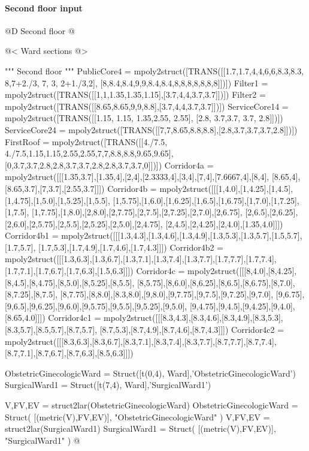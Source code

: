 \documentclass[11pt,oneside]{article}    %
\begin{document}
\paragraph{Second floor input} 
@D Second floor
@{
@< Ward sections @>

""" Second floor """
PublicCore4 = mpoly2struct([TRANS([[1.7,1.7,4,4,6,6,8.3,8.3, 8,7+2./3, 7, 3, 2+1./3,2], [8,8.4,8.4,9,9,8.4,8.4,8,8,8,8,8,8,8]])])
Filter1 = mpoly2struct([TRANS([[1,1,1.35,1.35,1.15],[3.7,4,4,3.7,3.7]])])
Filter2 = mpoly2struct([TRANS([[8.65,8.65,9,9,8.8],[3.7,4,4,3.7,3.7]])])
ServiceCore14 = mpoly2struct([TRANS([[1.15, 1.15, 1.35,2.55, 2.55], [2.8, 3.7,3.7, 3.7, 2.8]])])
ServiceCore24 = mpoly2struct([TRANS([[7,7,8.65,8.8,8.8],[2.8,3.7,3.7,3.7,2.8]])])
FirstRoof = mpoly2struct([TRANS([[4./7.5, 4./7.5,1.15,1.15,2.55,2.55,7,7,8.8,8.8,9.65,9.65], [0,3.7,3.7,2.8,2.8,3.7,3.7,2.8,2.8,3.7,3.7,0]])])
Corridor4a = mpoly2struct([[[1.35,3.7],[1.35,4],[2,4],[2.3333,4],[3,4],[7,4],[7.6667,4],[8,4], [8.65,4],[8.65,3.7],[7,3.7],[2.55,3.7]]])
Corridor4b = mpoly2struct([[[1,4.0],[1,4.25],[1,4.5],[1,4.75],[1,5.0],[1,5.25],[1,5.5], [1,5.75],[1,6.0],[1,6.25],[1,6.5],[1,6.75],[1,7.0],[1,7.25],[1,7.5], [1,7.75],[1,8.0],[2,8.0],[2,7.75],[2,7.5],[2,7.25],[2,7.0],[2,6.75], [2,6.5],[2,6.25],[2,6.0],[2,5.75],[2,5.5],[2,5.25],[2,5.0],[2,4.75], [2,4.5],[2,4.25],[2,4.0],[1.35,4.0]]])
Corridor4b1 = mpoly2struct([[[1.3,4.3],[1.3,4.6],[1.3,4.9],[1.3,5.3],[1.3,5.7],[1.5,5.7],[1.7,5.7], [1.7,5.3],[1.7,4.9],[1.7,4.6],[1.7,4.3]]])
Corridor4b2 = mpoly2struct([[[1.3,6.3],[1.3,6.7],[1.3,7.1],[1.3,7.4],[1.3,7.7],[1.7,7.7],[1.7,7.4], [1.7,7.1],[1.7,6.7],[1.7,6.3],[1.5,6.3]]])
Corridor4c = mpoly2struct([[[8,4.0],[8,4.25],[8,4.5],[8,4.75],[8,5.0],[8,5.25],[8,5.5], [8,5.75],[8,6.0],[8,6.25],[8,6.5],[8,6.75],[8,7.0],[8,7.25],[8,7.5], [8,7.75],[8,8.0],[8.3,8.0],[9,8.0],[9,7.75],[9,7.5],[9,7.25],[9,7.0], [9,6.75],[9,6.5],[9,6.25],[9,6.0],[9,5.75],[9,5.5],[9,5.25],[9,5.0], [9,4.75],[9,4.5],[9,4.25],[9,4.0],[8.65,4.0]]])
Corridor4c1 = mpoly2struct([[[8.3,4.3],[8.3,4.6],[8.3,4.9],[8.3,5.3],[8.3,5.7],[8.5,5.7],[8.7,5.7], [8.7,5.3],[8.7,4.9],[8.7,4.6],[8.7,4.3]]])
Corridor4c2 = mpoly2struct([[[8.3,6.3],[8.3,6.7],[8.3,7.1],[8.3,7.4],[8.3,7.7],[8.7,7.7],[8.7,7.4], [8.7,7.1],[8.7,6.7],[8.7,6.3],[8.5,6.3]]])

ObstetricGinecologicWard = Struct([t(0,4), Ward],'ObstetricGinecologicWard')
SurgicalWard1 = Struct([t(7,4), Ward],'SurgicalWard1')

V,FV,EV = struct2lar(ObstetricGinecologicWard)
ObstetricGinecologicWard = Struct( [(metric(V),FV,EV)], "ObstetricGinecologicWard" )
V,FV,EV = struct2lar(SurgicalWard1)
SurgicalWard1 = Struct( [(metric(V),FV,EV)], "SurgicalWard1" )
@}
\end{document}
